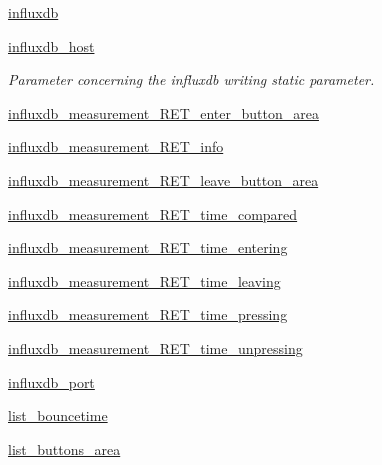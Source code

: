\begin{DoxyCompactItemize}
\item 
\hyperlink{classRET__Parameter_1_1RET__Parameter_a034f595b48aad7217bd228d3620eaca8}{influxdb}
\item 
\hyperlink{classRET__Parameter_1_1RET__Parameter_a2c910a8a000ce837b18cf2959297dcce}{influxdb\+\_\+host}
\begin{DoxyCompactList}\small\item\em Parameter concerning the influxdb writing static parameter. \end{DoxyCompactList}\item 
\hyperlink{classRET__Parameter_1_1RET__Parameter_a4bfb50623a19aa8895c6fe4f3ce17e9c}{influxdb\+\_\+measurement\+\_\+\+R\+E\+T\+\_\+enter\+\_\+button\+\_\+area}
\item 
\hyperlink{classRET__Parameter_1_1RET__Parameter_a0399fa1e6ff5bbf77163a8e8450ddf3a}{influxdb\+\_\+measurement\+\_\+\+R\+E\+T\+\_\+info}
\item 
\hyperlink{classRET__Parameter_1_1RET__Parameter_ac74f5bf0afa8dface6657e2476c8b67e}{influxdb\+\_\+measurement\+\_\+\+R\+E\+T\+\_\+leave\+\_\+button\+\_\+area}
\item 
\hyperlink{classRET__Parameter_1_1RET__Parameter_a95c19b8b4ee8e9855a6f80d76aafeadf}{influxdb\+\_\+measurement\+\_\+\+R\+E\+T\+\_\+time\+\_\+compared}
\item 
\hyperlink{classRET__Parameter_1_1RET__Parameter_af00e2a7d7c8c15ecf3b18f5ee175a38c}{influxdb\+\_\+measurement\+\_\+\+R\+E\+T\+\_\+time\+\_\+entering}
\item 
\hyperlink{classRET__Parameter_1_1RET__Parameter_a7117a3ae28fd4e0db24263ab8137b997}{influxdb\+\_\+measurement\+\_\+\+R\+E\+T\+\_\+time\+\_\+leaving}
\item 
\hyperlink{classRET__Parameter_1_1RET__Parameter_a01481db43c12efcf643f8abb82bb7d16}{influxdb\+\_\+measurement\+\_\+\+R\+E\+T\+\_\+time\+\_\+pressing}
\item 
\hyperlink{classRET__Parameter_1_1RET__Parameter_a0627ccd9ceed7f61236681f830f9d3a4}{influxdb\+\_\+measurement\+\_\+\+R\+E\+T\+\_\+time\+\_\+unpressing}
\item 
\hyperlink{classRET__Parameter_1_1RET__Parameter_a0d892e15d9fa78818d4495560d962ec2}{influxdb\+\_\+port}
\item 
\hyperlink{classRET__Parameter_1_1RET__Parameter_a19e1c5b8812bb41ecaa59c174a9cc027}{list\+\_\+bouncetime}
\item 
\hyperlink{classRET__Parameter_1_1RET__Parameter_ac4848af5696d2d98e426d3d775d6964d}{list\+\_\+buttons\+\_\+area}
\item 

\end{DoxyCompactItemize}
